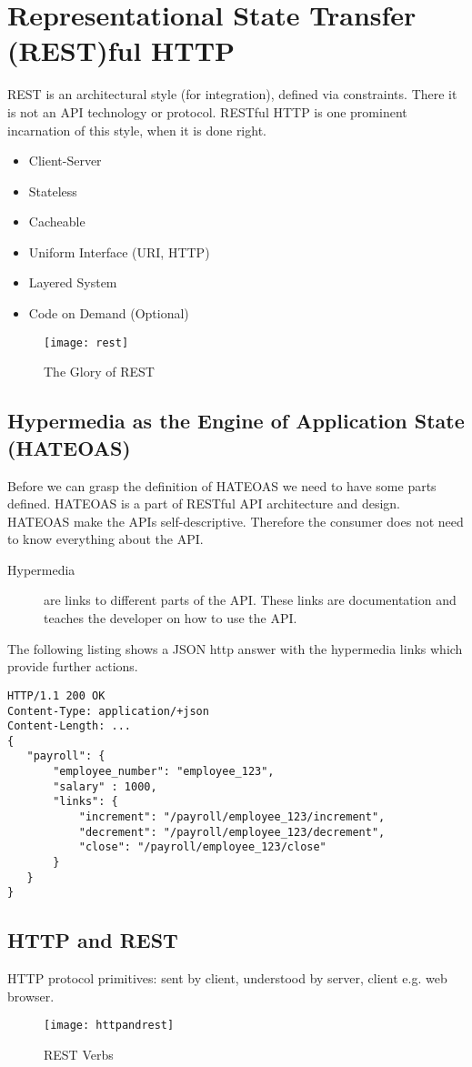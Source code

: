 \section{Representational State Transfer (REST)ful HTTP}
REST is an architectural style (for integration), defined via constraints. There it is not an API technology or protocol. RESTful HTTP is one prominent incarnation of this style, when it is done right. 

\begin{itemize}
	\item Client-Server
	\item Stateless
	\item Cacheable
	\item Uniform Interface (URI, HTTP)
	\item Layered System
	\item Code on Demand (Optional)
\end{itemize}

\begin{figure}[H]
  \center
  \texttt{[image: rest]}
  \caption{The Glory of REST}
\end{figure}

\subsection{Hypermedia as the Engine of Application State (HATEOAS)}
Before we can grasp the definition of HATEOAS we need to have some parts defined. HATEOAS is a part of RESTful API architecture and design. HATEOAS make the APIs self-descriptive. Therefore the consumer does not need to know everything about the API.

\begin{description}
	\item [Hypermedia] are links to different parts of the API. These links are documentation and teaches the developer on how to use the API. 
\end{description}

The following listing shows a JSON http answer with the hypermedia links which provide further actions. 

\begin{lstlisting}
HTTP/1.1 200 OK
Content-Type: application/+json
Content-Length: ...
{
   "payroll": {
       "employee_number": "employee_123",
       "salary" : 1000,
       "links": {
           "increment": "/payroll/employee_123/increment",
           "decrement": "/payroll/employee_123/decrement",
           "close": "/payroll/employee_123/close"
       }
   }
}
\end{lstlisting}

\subsection{HTTP and REST}
HTTP protocol primitives: sent by client, understood by server, client e.g. web browser.

\begin{figure}[H]
  \center
  \texttt{[image: httpandrest]}
  \caption{REST Verbs}
\end{figure}


